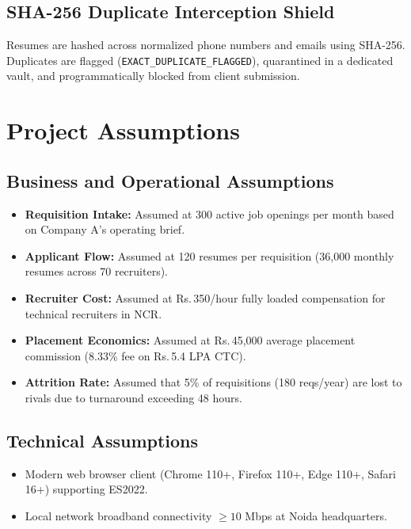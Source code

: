 \documentclass[11pt,a4paper,oneside]{report}
\newcommand{\INR}{\textsf{Rs.\,}}
\begin{document}
\section{SHA-256 Duplicate Interception Shield}
Resumes are hashed across normalized phone numbers and emails using SHA-256. Duplicates are flagged (\texttt{EXACT\_DUPLICATE\_FLAGGED}), quarantined in a dedicated vault, and programmatically blocked from client submission.

\chapter{Project Assumptions}

\section{Business and Operational Assumptions}
\begin{itemize}[leftmargin=1.5em]
    \item \textbf{Requisition Intake:} Assumed at 300 active job openings per month based on Company A's operating brief.
    \item \textbf{Applicant Flow:} Assumed at 120 resumes per requisition (36,000 monthly resumes across 70 recruiters).
    \item \textbf{Recruiter Cost:} Assumed at \INR 350/hour fully loaded compensation for technical recruiters in NCR.
    \item \textbf{Placement Economics:} Assumed at \INR 45,000 average placement commission (8.33\% fee on \INR 5.4 LPA CTC).
    \item \textbf{Attrition Rate:} Assumed that 5\% of requisitions (180 reqs/year) are lost to rivals due to turnaround exceeding 48 hours.
\end{itemize}

\section{Technical Assumptions}
\begin{itemize}[leftmargin=1.5em]
    \item Modern web browser client (Chrome 110+, Firefox 110+, Edge 110+, Safari 16+) supporting ES2022.
    \item Local network broadband connectivity $\ge 10$ Mbps at Noida headquarters.
\end{itemize}
\end{document}
